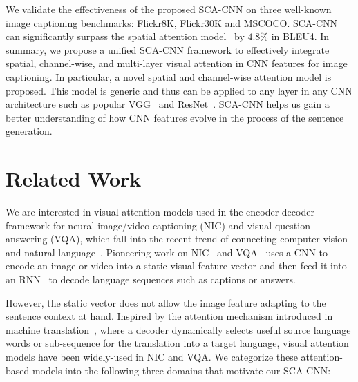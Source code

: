 \documentclass[10pt,twocolumn,letterpaper]{article}
\begin{document}
We validate the effectiveness of the proposed SCA-CNN on three well-known image captioning benchmarks: Flickr8K, Flickr30K and MSCOCO. SCA-CNN can
significantly surpass the spatial attention model~\cite{xu2015show} by $4.8\%$ in BLEU4. In summary, we propose a unified SCA-CNN framework to effectively
integrate spatial, channel-wise, and multi-layer visual attention in CNN features for image captioning. In particular, a novel spatial and channel-wise
attention model is proposed. This model is generic and thus can be applied to any layer in any CNN architecture such as popular VGG~\cite{simonyan2014very}
and ResNet~\cite{he2015deep}. SCA-CNN helps us gain a better understanding of how CNN features evolve in the process of the sentence generation.

\section{Related Work}

We are interested in visual attention models used in the encoder-decoder framework for neural image/video captioning (NIC) and visual question answering
(VQA), which fall into the recent trend of connecting computer vision and natural
language~\cite{krishna2016visual,zhang2017relation,shen2013inductive,shen2015supervised,zhao2016partial,jiang2015deep}. Pioneering work on
NIC~\cite{vinyals2015show,karpathy2015deep,donahue2015long,venugopalan2014translating,venugopalan2015sequence} and
VQA~\cite{antol2015vqa,malinowski2015ask,gao2015you,ren2015exploring} uses a CNN to encode an image or video into a static visual feature vector and then feed
it into an RNN~\cite{lstm} to decode language sequences such as captions or answers.

However, the static vector does not allow the image feature adapting to the sentence context at hand. Inspired by the attention mechanism introduced in
machine translation~\cite{bahdanau2014neural}, where a decoder dynamically selects useful source language words or sub-sequence for the translation into a
target language, visual attention models have been widely-used in NIC and VQA. We categorize these attention-based models into the following three domains
that motivate our SCA-CNN:
\end{document}
